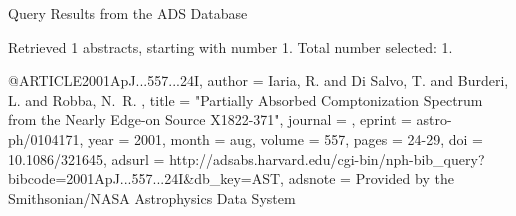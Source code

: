 Query Results from the ADS Database


Retrieved 1 abstracts, starting with number 1.  Total number selected: 1.

@ARTICLE{2001ApJ...557...24I,
   author = {{Iaria}, R. and {Di Salvo}, T. and {Burderi}, L. and {Robba}, N.~R.
	},
    title = "{Partially Absorbed Comptonization Spectrum from the Nearly Edge-on Source X1822-371}",
  journal = {\apj},
   eprint = {astro-ph/0104171},
     year = 2001,
    month = aug,
   volume = 557,
    pages = {24-29},
      doi = {10.1086/321645},
   adsurl = {http://adsabs.harvard.edu/cgi-bin/nph-bib_query?bibcode=2001ApJ...557...24I&db_key=AST},
  adsnote = {Provided by the Smithsonian/NASA Astrophysics Data System}
}


